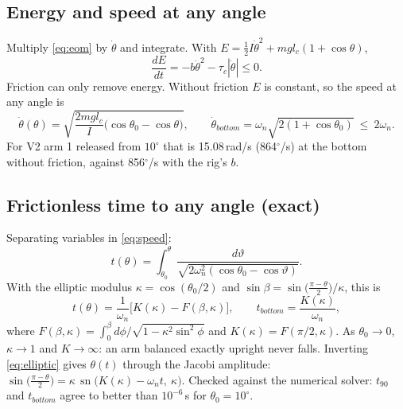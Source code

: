 \documentclass[10pt]{article}
\begin{document}
\subsection{Energy and speed at any angle}
Multiply \eqref{eq:eom} by $\dot\theta$ and integrate. With $E=\tfrac12I\dot\theta^2+mgl_c(1+\cos\theta)$,
\begin{equation}
\frac{dE}{dt} = -b\dot\theta^2-\tau_c|\dot\theta| \le 0 .
\end{equation}
Friction can only remove energy. Without friction $E$ is constant, so the speed at any angle is
\begin{equation}
\dot\theta(\theta)=\sqrt{\frac{2mgl_c}{I}\big(\cos\theta_0-\cos\theta\big)}, \qquad
\dot\theta_{bottom}=\omega_n\sqrt{2(1+\cos\theta_0)}\ \le\ 2\omega_n .
\label{eq:speed}
\end{equation}
For V2 arm 1 released from $10^\circ$ that is 15.08\,rad/s (864$^\circ$/s) at the bottom without friction, against 856$^\circ$/s with the rig's $b$.

\subsection{Frictionless time to any angle (exact)}\label{sec:elliptic}
Separating variables in \eqref{eq:speed}:
\begin{equation}
t(\theta)=\int_{\theta_0}^{\theta}\frac{d\vartheta}{\sqrt{2\omega_n^2(\cos\theta_0-\cos\vartheta)}} .
\label{eq:tint}
\end{equation}
With the elliptic modulus $\kappa=\cos(\theta_0/2)$ and $\sin\beta=\sin\!\big(\tfrac{\pi-\theta}{2}\big)/\kappa$, this is
\begin{equation}
t(\theta)=\frac{1}{\omega_n}\Big[K(\kappa)-F(\beta,\kappa)\Big],\qquad
t_{bottom}=\frac{K(\kappa)}{\omega_n},
\label{eq:elliptic}
\end{equation}
where $F(\beta,\kappa)=\int_0^\beta d\phi/\sqrt{1-\kappa^2\sin^2\phi}$ and $K(\kappa)=F(\pi/2,\kappa)$. As $\theta_0\to0$, $\kappa\to1$ and $K\to\infty$: an arm balanced exactly upright never falls. Inverting \eqref{eq:elliptic} gives $\theta(t)$ through the Jacobi amplitude: $\sin\!\big(\tfrac{\pi-\theta}{2}\big)=\kappa\,\operatorname{sn}\!\big(K(\kappa)-\omega_nt,\ \kappa\big)$. Checked against the numerical solver: $t_{90}$ and $t_{bottom}$ agree to better than $10^{-6}$\,s for $\theta_0=10^\circ$.
\end{document}
